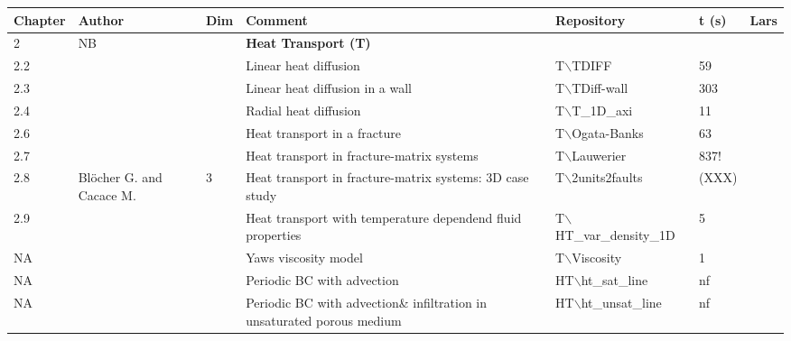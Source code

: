 \begin{landscape}
\begin{center}
\begin{tabularx}{\linewidth}{lllXXll}
\toprule
Chapter&Author&Dim&Comment&Repository&t (s)&Lars\\
\midrule
2       &NB&&\textbf{Heat Transport (T)}&&&\\   
2.2&&&          Linear heat diffusion&  T$\backslash$TDIFF&59&\\
2.3&&&          Linear heat diffusion in a wall&T$\backslash$TDiff-wall&303&\\
2.4&&&          Radial heat diffusion&  T$\backslash$T\_1D\_axi &11&\\
2.6&&&          Heat transport in a fracture&   T$\backslash$Ogata-Banks&63&\\
2.7&&&          Heat transport in fracture-matrix systems&      T$\backslash$Lauwerier&837!&\\
2.8&Bl\"ocher G. and Cacace M.&3&Heat transport in fracture-matrix systems: 3D case study&T$\backslash$2units2faults&(XXX)&\\
2.9&&&          Heat transport with temperature dependend fluid properties&T$\backslash$HT\_var\_density\_1D&5&\\ 
NA&&&                   Yaws viscosity model& T$\backslash$Viscosity&1&\\       
NA&&&           Periodic BC with advection&     HT$\backslash$ht\_sat\_line&nf&\\
NA&&&   Periodic BC with advection\& infiltration in unsaturated porous medium &        HT$\backslash$ht\_unsat\_line&nf&\\ 
\midrule


\end{tabularx}
\end{center}
\end{landscape}
